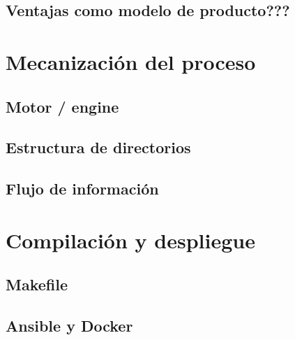 \subsection{Ventajas como modelo de producto???}

\section{Mecanización del proceso}
\subsection{Motor / engine}
\subsection{Estructura de directorios}
\subsection{Flujo de información}

\section{Compilación y despliegue}
\subsection{Makefile}
\subsection{Ansible y Docker}



